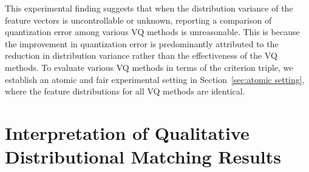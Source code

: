 \begin{table}[!h]  
\centering
\vspace{-2ex}
\caption{The criterion triple influence by the distribution variance.}
\vspace{-1ex}
\vspace{-2ex}
\label{table:distribution variance}
\end{table}

This experimental finding suggests that when the distribution variance of the feature vectors is uncontrollable or unknown, reporting a comparison of quantization error among various VQ methods is unreasonable. This is because the improvement in quantization error is predominantly attributed to the reduction in distribution variance rather than the effectiveness of the VQ methods. To evaluate various VQ methods in terms of the criterion triple, we establish an atomic and fair experimental setting in Section~\ref{sec:atomic setting}, where the feature distributions for all VQ methods are identical.

\section{Interpretation of Qualitative Distributional Matching Results}
\label{appendix:prototypical study}

